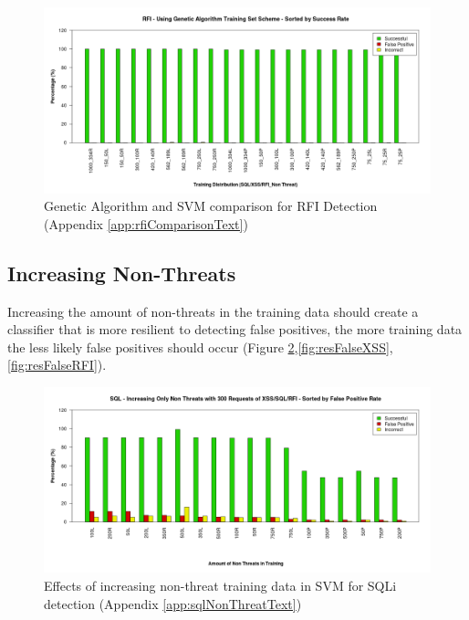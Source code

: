 \begin{figure}[H]
	\centering
	\includegraphics[width=450px]{./assets/appendix/fullresults/svm/comparison/Results_RFI.png}
	\caption{Genetic Algorithm and SVM comparison for RFI Detection (Appendix \ref{app:rfiComparisonText})}
	\label{fig:resComparisonRFI}
\end{figure}

\newpage
\subsection{Increasing Non-Threats} \label{sec:resNonThreat}

Increasing the amount of non-threats in the training data should create a classifier that is more resilient to detecting false positives, the more training data the less likely false positives should occur (Figure \ref{fig:resFalseSQL},\ref{fig:resFalseXSS},\ref{fig:resFalseRFI}).

\begin{figure}[H]
	\centering
	\includegraphics[width=450px]{./assets/results/svm/nonthreat/Results_SQL.png}
	\caption{Effects of increasing non-threat training data in SVM for SQLi detection (Appendix \ref{app:sqlNonThreatText})}
	\label{fig:resFalseSQL}
\end{figure}

